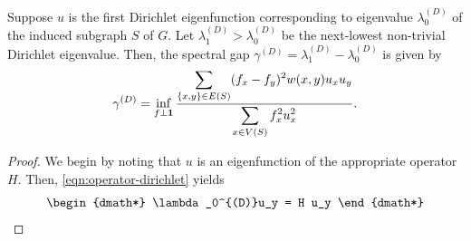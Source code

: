     \begin{thm}\label{thm:dirichlet}
    Suppose $u$ is the first Dirichlet eigenfunction corresponding to eigenvalue $\lambda_0^{(D)}$ of the induced subgraph $S$ of $G$. Let $\lambda_1^{(D)} > \lambda_0^{(D)}$ be the next-lowest non-trivial Dirichlet eigenvalue. Then, the spectral gap $\gamma^{(D)} = \lambda_1^{(D)} - \lambda_0^{(D)}$ is given by
        \[
            \gamma^{(D)} = \inf_{f \perp \mathbf{1}} \frac{\displaystyle \sum_{\{x,y\} \in E(S)}(f_x -f_y)^2 w(x,y)u_x u_y}{\displaystyle \sum_{x \in V(S)}f_x^2 u_x^2}.
        \]
    \end{thm}
    \begin{proof}
        We begin by noting that $u$ is an eigenfunction of the appropriate operator $H$. Then, \cref{eqn:operator-dirichlet} yields
        \begin{dgroup*}
            \begin{dmath*}
                \lambda_0^{(D)}u_y = H u_y
            \end{dmath*}
            

\end{dgroup*}
\end{proof}
